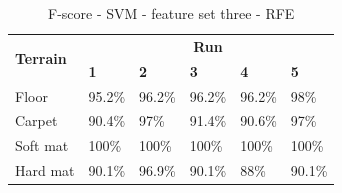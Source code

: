 \documentclass[USenglish]{ifimaster}  %
\begin{document}
\begin{table}[h]\ContinuedFloat
	\begin{subtable}[h]{1\textwidth}
		\centering
		\captionsetup{justification=centering}
		\begin{tabular}{@{}llllll@{}}
			\toprule
			\multirow{2}{*}{\textbf{Terrain}} & \multicolumn{5}{c}{\textbf{Run}} \\ \cmidrule(l){2-6} 
			& \multicolumn{1}{l|}{\textbf{1}} & \multicolumn{1}{l|}{\textbf{2}} & \multicolumn{1}{l|}{\textbf{3}} & \multicolumn{1}{l|}{\textbf{4}} & \textbf{5} \\ \midrule
			\multicolumn{1}{l|}{Floor} & \multicolumn{1}{l|}{95.2\%} & \multicolumn{1}{l|}{96.2\%} & \multicolumn{1}{l|}{96.2\%} & \multicolumn{1}{l|}{96.2\%} & 98\% \\ \midrule
			\multicolumn{1}{l|}{Carpet} & \multicolumn{1}{l|}{90.4\%} & \multicolumn{1}{l|}{97\%} & \multicolumn{1}{l|}{91.4\%} & \multicolumn{1}{l|}{90.6\%} & 97\% \\ \midrule
			\multicolumn{1}{l|}{Soft mat} & \multicolumn{1}{l|}{100\%} & \multicolumn{1}{l|}{100\%} & \multicolumn{1}{l|}{100\%} & \multicolumn{1}{l|}{100\%} & 100\% \\ \midrule
			\multicolumn{1}{l|}{Hard mat} & \multicolumn{1}{l|}{90.1\%} & \multicolumn{1}{l|}{96.9\%} & \multicolumn{1}{l|}{90.1\%} & \multicolumn{1}{l|}{88\%} & 90.1\% \\ \bottomrule
		\end{tabular}
		\caption{F-score - SVM - feature set three - RFE}
		\label{fscoresvm}
	\end{subtable}
\end{table}
\end{document}
